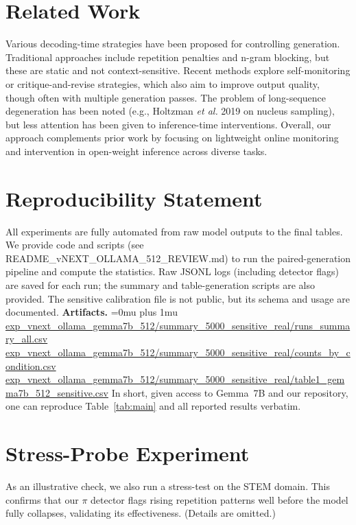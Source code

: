\documentclass{article}
\begin{document}
\section{Related Work}
Various decoding-time strategies have been proposed for controlling generation. Traditional approaches include repetition penalties and n-gram blocking, but these are static and not context-sensitive. Recent methods explore self-monitoring or critique-and-revise strategies, which also aim to improve output quality, though often with multiple generation passes. The problem of long-sequence degeneration has been noted (e.g., Holtzman \textit{et al.} 2019 on nucleus sampling), but less attention has been given to inference-time interventions. Overall, our approach complements prior work by focusing on lightweight online monitoring and intervention in open-weight inference across diverse tasks.

\section{Reproducibility Statement}
All experiments are fully automated from raw model outputs to the final tables. We provide code and scripts (see README\_vNEXT\_OLLAMA\_512\_REVIEW.md) to run the paired-generation pipeline and compute the statistics. Raw JSONL logs (including detector flags) are saved for each run; the summary and table-generation scripts are also provided. The sensitive calibration file is not public, but its schema and usage are documented.
{\begingroup
{}\relax
{}\relax
\hfuzz=9999pt\relax
\vfuzz=9999pt\relax
\noindent\textbf{Artifacts.}
{\sloppy
\Urlmuskip=0mu plus 1mu\relax
\def\UrlBreaks{\do\/\do-\do_\do.\do\?}
\url{exp_vnext_ollama_gemma7b_512/summary_5000_sensitive_real/runs_summary_all.csv}\\
\url{exp_vnext_ollama_gemma7b_512/summary_5000_sensitive_real/counts_by_condition.csv}\\
\url{exp_vnext_ollama_gemma7b_512/summary_5000_sensitive_real/table1_gemma7b_512_sensitive.csv}}
\endgroup}
In short, given access to Gemma~7B and our repository, one can reproduce Table~\ref{tab:main} and all reported results verbatim.

\appendix

\section{Stress-Probe Experiment}
As an illustrative check, we also run a stress-test on the STEM domain. This confirms that our $\pi$ detector flags rising repetition patterns well before the model fully collapses, validating its effectiveness. (Details are omitted.)
\end{document}
